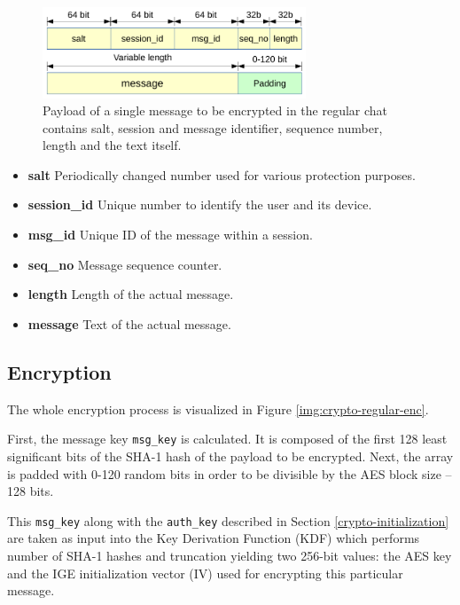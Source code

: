 \documentclass[thesis=M,english]{FITthesis}[2012/10/20]
\begin{document}
\begin{figure}[htb]
	\centering
	\includegraphics[width=0.7\textwidth]{regular-payload.pdf}
	\caption[Message payload in regular chats]{Payload of a single message to be encrypted in the regular chat contains salt, session and message identifier, sequence number, length and the text itself.}
	\label{img:regular-payload}
\end{figure}

\begin{itemize}
	\item \textbf{salt} Periodically changed number used for various protection purposes.
	\item \textbf{session\_id} Unique number to identify the user and its device.
	\item \textbf{msg\_id} Unique ID of the message within a session.
	\item \textbf{seq\_no} Message sequence counter.
	\item \textbf{length} Length of the actual message.
	\item \textbf{message} Text of the actual message.
\end{itemize}


\subsection{Encryption}\label{crypto-regular-enc}

The whole encryption process is visualized in Figure \ref{img:crypto-regular-enc}.

First, the message key \texttt{msg\_key} is calculated. It is composed of the first 128 least significant bits of the SHA-1 hash of the payload to be encrypted. Next, the array is padded with 0-120 random bits in order to be divisible by the AES block size -- 128 bits.

This \texttt{msg\_key} along with the \texttt{auth\_key} described in Section \ref{crypto-initialization} are taken as input into the Key Derivation Function (KDF) which performs number of SHA-1 hashes and truncation yielding two 256-bit values: the AES key and the IGE initialization vector (IV) used for encrypting this particular message.
\end{document}
